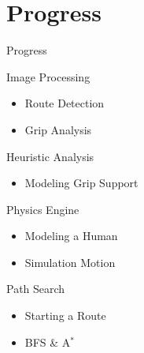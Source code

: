 \documentclass{beamer}
\begin{document}
\section{Progress}
\begin{frame}[T]{Progress}

\pause
\begin{block}{Image Processing}
\begin{itemize}
 \item Route Detection
 \item Grip Analysis
\end{itemize}
\end{block}


\begin{block}{Heuristic Analysis}
\begin{itemize}
 \item \alert{Modeling Grip Support}
\end{itemize}
\end{block}


\begin{block}{Physics Engine}
\begin{itemize}
 \item Modeling a Human
 \item Simulation Motion
\end{itemize}
\end{block}


\begin{block}{Path Search}
\begin{itemize}
 \item Starting a Route
 \item BFS \& \alert{A$^*$}
\end{itemize}
\end{block}

\end{frame}
\end{document}
